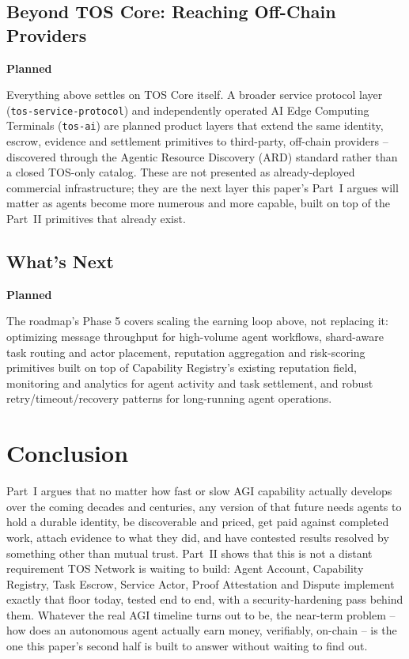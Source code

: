 \documentclass[11pt,oneside]{article}
\newcommand{\planned}{\textbf{Planned}}
\begin{document}
\subsection{Beyond TOS Core: Reaching Off-Chain Providers} \hfill \planned

Everything above settles on TOS Core itself. A broader service protocol layer
(\texttt{tos-service-protocol}) and independently operated AI Edge Computing Terminals
(\texttt{tos-ai}) are planned product layers that extend the same identity, escrow, evidence
and settlement primitives to third-party, off-chain providers -- discovered through the
Agentic Resource Discovery (ARD) standard rather than a closed TOS-only catalog. These are not
presented as already-deployed commercial infrastructure; they are the next layer this paper's
Part~I argues will matter as agents become more numerous and more capable, built on top of the
Part~II primitives that already exist.

\subsection{What's Next} \hfill \planned

The roadmap's Phase 5 covers scaling the earning loop above, not replacing it: optimizing
message throughput for high-volume agent workflows, shard-aware task routing and actor
placement, reputation aggregation and risk-scoring primitives built on top of Capability
Registry's existing reputation field, monitoring and analytics for agent activity and task
settlement, and robust retry/timeout/recovery patterns for long-running agent operations.

\section{Conclusion}

Part~I argues that no matter how fast or slow AGI capability actually develops over the
coming decades and centuries, any version of that future needs agents to hold a durable
identity, be discoverable and priced, get paid against completed work, attach evidence to
what they did, and have contested results resolved by something other than mutual trust.
Part~II shows that this is not a distant requirement TOS Network is waiting to build: Agent
Account, Capability Registry, Task Escrow, Service Actor, Proof Attestation and Dispute
implement exactly that floor today, tested end to end, with a security-hardening pass behind
them. Whatever the real AGI timeline turns out to be, the near-term problem -- how does an
autonomous agent actually earn money, verifiably, on-chain -- is the one this paper's second
half is built to answer without waiting to find out.
\end{document}
